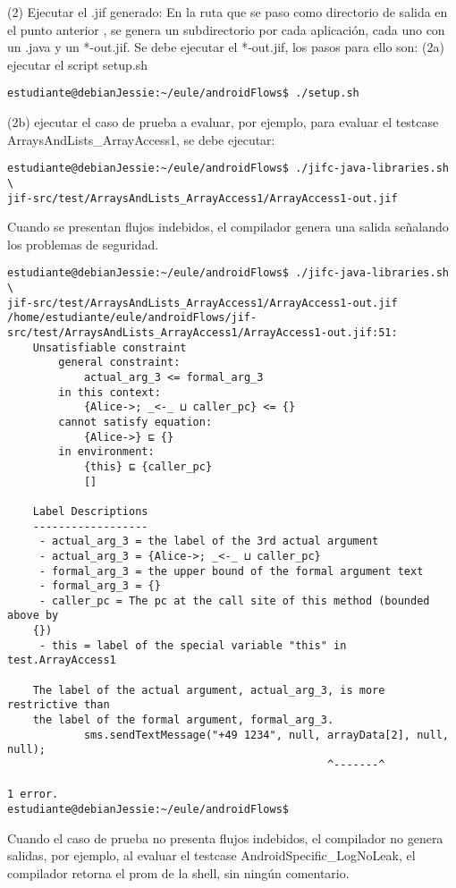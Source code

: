 (2) Ejecutar el .jif generado:\newline
En la ruta que se paso como directorio de salida en el punto
anterior {\small{}}, se genera un
subdirectorio por cada aplicación, cada uno con un .java y un *-out.jif.
Se debe ejecutar el *-out.jif, los pasos para ello son:\newline
(2a) ejecutar el script setup.sh
\begin{lstlisting}
estudiante@debianJessie:~/eule/androidFlows$ ./setup.sh
\end{lstlisting}
(2b) ejecutar el caso de prueba a evaluar, por ejemplo, para
evaluar el testcase ArraysAndLists\_ArrayAccess1, se debe ejecutar:
\begin{lstlisting}
estudiante@debianJessie:~/eule/androidFlows$ ./jifc-java-libraries.sh \
jif-src/test/ArraysAndLists_ArrayAccess1/ArrayAccess1-out.jif
\end{lstlisting}
Cuando se presentan flujos indebidos, el compilador genera una salida señalando
los problemas de seguridad.
\lstset{
    language=bash,
    basicstyle=\tiny,
  }
\begin{lstlisting}
estudiante@debianJessie:~/eule/androidFlows$ ./jifc-java-libraries.sh \
jif-src/test/ArraysAndLists_ArrayAccess1/ArrayAccess1-out.jif 
/home/estudiante/eule/androidFlows/jif-src/test/ArraysAndLists_ArrayAccess1/ArrayAccess1-out.jif:51: 
    Unsatisfiable constraint
    	general constraint:
    		actual_arg_3 <= formal_arg_3
    	in this context:
    		{Alice->; _<-_ ⊔ caller_pc} <= {}
    	cannot satisfy equation:
    		{Alice->} ⊑ {}
    	in environment:
    		{this} ⊑ {caller_pc}
    		[]

    Label Descriptions
    ------------------
     - actual_arg_3 = the label of the 3rd actual argument
     - actual_arg_3 = {Alice->; _<-_ ⊔ caller_pc}
     - formal_arg_3 = the upper bound of the formal argument text
     - formal_arg_3 = {}
     - caller_pc = The pc at the call site of this method (bounded above by 
    {})
     - this = label of the special variable "this" in test.ArrayAccess1

    The label of the actual argument, actual_arg_3, is more restrictive than 
    the label of the formal argument, formal_arg_3.
            sms.sendTextMessage("+49 1234", null, arrayData[2], null, null);
                                                  ^-------^

1 error.
estudiante@debianJessie:~/eule/androidFlows$
\end{lstlisting}

Cuando el caso de prueba no presenta flujos indebidos, el compilador no genera
salidas, por ejemplo, al evaluar el testcase AndroidSpecific\_LogNoLeak, el
compilador retorna el prom de la shell, sin ningún comentario.
